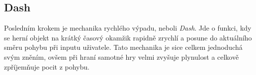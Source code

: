 \subsection{Dash}

Posledním krokem je mechanika rychlého výpadu, neboli \textit{Dash}. Jde o funkci, kdy se herní objekt na krátký časový okamžik rapidně zrychlí a posune do aktuálního směru pohybu při inputu uživatele. Tato mechanika je sice celkem jednoduchá svým zněním, ovšem při hraní samotné hry velmi zvyšuje plynulost a celkově zpříjemňuje pocit z pohybu.